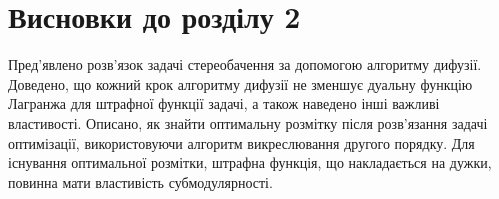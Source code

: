 \section*{Висновки до розділу 2}

Пред'явлено розв'язок задачі стереобачення за допомогою алгоритму дифузії.
Доведено, що кожний крок алгоритму дифузії не зменшує дуальну функцію Лагранжа
для штрафної функції задачі, а також наведено інші важливі властивості.
Описано, як знайти оптимальну розмітку після розв'язання задачі оптимізації,
використовуючи алгоритм викреслювання другого порядку.
Для існування оптимальної розмітки, штрафна функція, що накладається на дужки,
повинна мати властивість субмодулярності.
